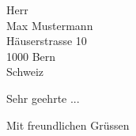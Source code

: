 \documentclass[
  fontsize=11pt,
  paper=a4,
  parskip=half,
  enlargefirstpage=on,    %
  fromalign=right,        %
  fromphone=on,           %
  fromemail=on,           %
  fromrule=aftername,     %
  addrfield=on,           %
  backaddress=on,         %
  subject=beforeopening,  %
  locfield=narrow,        %
  foldmarks=on,           %
]{scrlttr2}
\begin{document}
  \begin{letter}{Herr\\Max Mustermann\\Häuserstrasse 10\\1000 Bern\\Schweiz}
    \opening{Sehr geehrte ...}

    \closing{Mit freundlichen Grüssen}
  \end{letter}
\end{document}

